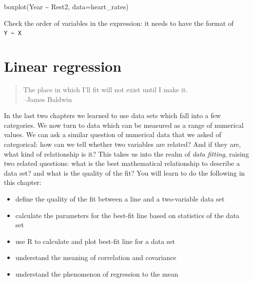 \documentclass[
  letterpaper,
  DIV=11,
  numbers=noendperiod]{scrreprt}
\newenvironment{Shaded}{\begin{snugshade}}{\end{snugshade}}
\newcommand{\NormalTok}[1]{\textcolor[rgb]{0.00,0.23,0.31}{#1}}
\providecommand{\tightlist}{%
  \setlength{\itemsep}{0pt}\setlength{\parskip}{0pt}}\usepackage{longtable,booktabs,array}
\begin{document}
\begin{Shaded}
\begin{Highlighting}[]
\NormalTok{boxplot(Year \textasciitilde{} Rest2, data=heart\_rates)}
\end{Highlighting}
\end{Shaded}

\begin{tcolorbox}[enhanced jigsaw, arc=.35mm, colframe=quarto-callout-caution-color-frame, left=2mm, opacitybacktitle=0.6, breakable, title=\textcolor{quarto-callout-caution-color}{\faFire}\hspace{0.5em}{Hint}, toprule=.15mm, coltitle=black, bottomtitle=1mm, toptitle=1mm, colback=white, leftrule=.75mm, colbacktitle=quarto-callout-caution-color!10!white, titlerule=0mm, opacityback=0, rightrule=.15mm, bottomrule=.15mm]

Check the order of variables in the expression: it needs to have the
format of \texttt{Y\ \textasciitilde{}\ X}

\end{tcolorbox}


\hypertarget{linear-regression}{%
\chapter{Linear regression}\label{linear-regression}}

\begin{quote}
The place in which I'll fit will not exist until I make it.\\
--James Baldwin
\end{quote}

In the last two chapters we learned to use data sets which fall into a
few categories. We now turn to data which can be measured as a range of
numerical values. We can ask a similar question of numerical data that
we asked of categorical: how can we tell whether two variables are
related? And if they are, what kind of relationship is it? This takes us
into the realm of \emph{data fitting}, raising two related questions:
what is the best mathematical relationship to describe a data set? and
what is the quality of the fit? You will learn to do the following in
this chapter:

\begin{itemize}
\tightlist
\item
  define the quality of the fit between a line and a two-variable data
  set
\item
  calculate the parameters for the best-fit line based on statistics of
  the data set
\item
  use R to calculate and plot best-fit line for a data set
\item
  understand the meaning of correlation and covariance
\item
  understand the phenomenon of regression to the mean
\end{itemize}
\end{document}
